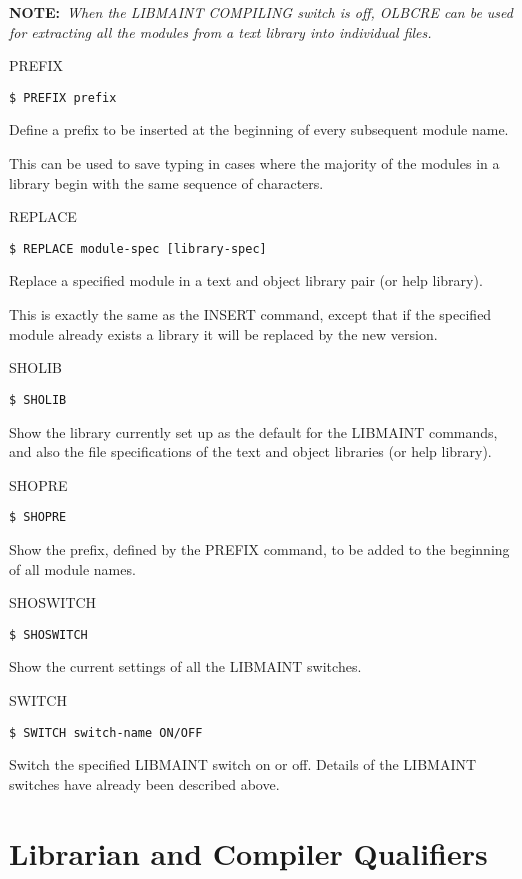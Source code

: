 \begin{list}{}{\setlength{\labelwidth}{\numlen}\setlength{\leftmargin}{\numlen}
\addtolength{\leftmargin}{\labelsep}}
{\bf NOTE:}~{\it When the LIBMAINT COMPILING switch is off, OLBCRE can be used
for extracting all the modules from a text library into individual
files.}

\item[PREFIX]
\begin{verbatim}
$ PREFIX prefix
\end{verbatim}
Define a prefix to be inserted at the beginning of every
subsequent module name.

This can be used to save typing in cases where
the majority of the modules in a library begin with the
same sequence of characters.

\item[REPLACE]
\begin{verbatim}
$ REPLACE module-spec [library-spec]
\end{verbatim}
Replace a specified module in a text and object library
pair (or help library).

This is exactly the same as the INSERT command, except that if
the specified module already exists a library it will
be replaced by the new version.

\item[SHOLIB]
\begin{verbatim}
$ SHOLIB
\end{verbatim}
Show the library currently set up as the default for the
LIBMAINT commands, and also the file specifications of the text and
object libraries (or help library).

\item[SHOPRE]
\begin{verbatim}
$ SHOPRE
\end{verbatim}
Show the prefix, defined by the PREFIX command, to be added to
the beginning of all module names.

\item[SHOSWITCH]
\begin{verbatim}
$ SHOSWITCH
\end{verbatim}
Show the current settings of all the LIBMAINT switches.

\item[SWITCH]
\begin{verbatim}
$ SWITCH switch-name ON/OFF
\end{verbatim}
Switch the specified LIBMAINT switch on or off.
Details of the LIBMAINT switches have already been described above.
\end{list}

\section{Librarian and Compiler Qualifiers}

